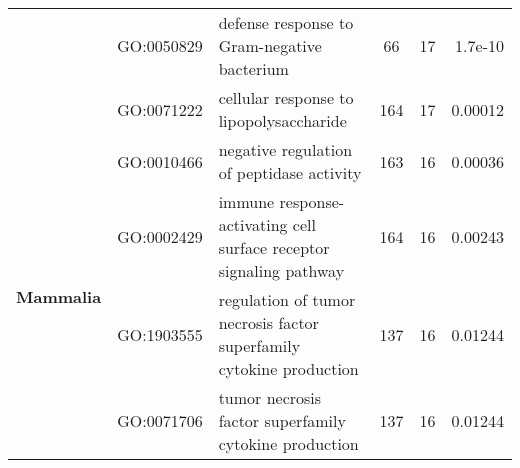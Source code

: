 \documentclass[../main.tex]{subfiles}
\begin{document}
\begin{landscape}
\begin{longtable}{@{}lllccr@{}}
		                                               & GO:0050829                         & defense response to Gram-negative bacterium                               & 66                                                                 & 17                                                                   & 1.7e-10                                                                                  \\
		                                               & GO:0071222                         & cellular response to lipopolysaccharide                                   & 164                                                                & 17                                                                   & 0.00012                                                                                  \\
		\multirow{13}{*}{\textbf{Mammalia}}            & GO:0010466                         & negative regulation of peptidase activity                                 & 163                                                                & 16                                                                   & 0.00036                                                                                  \\
		                                               & GO:0002429                         & immune response-activating cell surface receptor signaling pathway        & 164                                                                & 16                                                                   & 0.00243                                                                                  \\
		                                               & GO:1903555                         & regulation of tumor necrosis factor superfamily cytokine production       & 137                                                                & 16                                                                   & 0.01244                                                                                  \\
		                                               & GO:0071706                         & tumor necrosis factor superfamily cytokine production                     & 137                                                                & 16                                                                   & 0.01244                                                                                  \\

\end{longtable}
\end{landscape}
\end{document}
